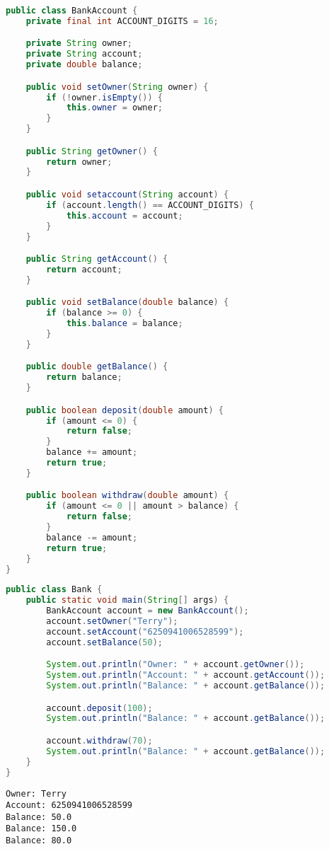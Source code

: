 \begin{lstlisting}[language=Java]
public class BankAccount {
    private final int ACCOUNT_DIGITS = 16;

    private String owner;
    private String account;
    private double balance;

    public void setOwner(String owner) {
        if (!owner.isEmpty()) {
            this.owner = owner;
        }
    }

    public String getOwner() {
        return owner;
    }

    public void setaccount(String account) {
        if (account.length() == ACCOUNT_DIGITS) {
            this.account = account;
        }
    }

    public String getAccount() {
        return account;
    }

    public void setBalance(double balance) {
        if (balance >= 0) {
            this.balance = balance;
        }
    }

    public double getBalance() {
        return balance;
    }

    public boolean deposit(double amount) {
        if (amount <= 0) {
            return false;
        }
        balance += amount;
        return true;
    }

    public boolean withdraw(double amount) {
        if (amount <= 0 || amount > balance) {
            return false;
        }
        balance -= amount;
        return true;
    }
}
\end{lstlisting}

\begin{lstlisting}[language=Java]
public class Bank {
    public static void main(String[] args) {
        BankAccount account = new BankAccount();
        account.setOwner("Terry");
        account.setAccount("6250941006528599");
        account.setBalance(50);

        System.out.println("Owner: " + account.getOwner());
        System.out.println("Account: " + account.getAccount());
        System.out.println("Balance: " + account.getBalance());

        account.deposit(100);
        System.out.println("Balance: " + account.getBalance());

        account.withdraw(70);
        System.out.println("Balance: " + account.getBalance());
    }
}
\end{lstlisting}

\begin{tcolorbox}
    \begin{verbatim}
Owner: Terry
Account: 6250941006528599
Balance: 50.0
Balance: 150.0
Balance: 80.0
\end{verbatim}
\end{tcolorbox}

